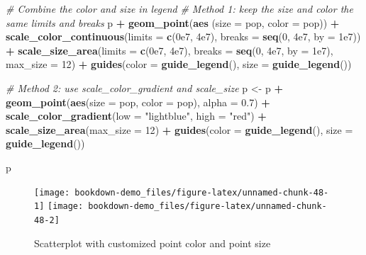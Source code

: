 \documentclass[]{book}
\newenvironment{Shaded}{\begin{snugshade}}{\end{snugshade}}
\newcommand{\KeywordTok}[1]{\textcolor[rgb]{0.13,0.29,0.53}{\textbf{#1}}}
\newcommand{\DataTypeTok}[1]{\textcolor[rgb]{0.13,0.29,0.53}{#1}}
\newcommand{\DecValTok}[1]{\textcolor[rgb]{0.00,0.00,0.81}{#1}}
\newcommand{\FloatTok}[1]{\textcolor[rgb]{0.00,0.00,0.81}{#1}}
\newcommand{\StringTok}[1]{\textcolor[rgb]{0.31,0.60,0.02}{#1}}
\newcommand{\CommentTok}[1]{\textcolor[rgb]{0.56,0.35,0.01}{\textit{#1}}}
\newcommand{\OperatorTok}[1]{\textcolor[rgb]{0.81,0.36,0.00}{\textbf{#1}}}
\newcommand{\NormalTok}[1]{#1}
\begin{document}
\begin{Shaded}
\begin{Highlighting}[]
\CommentTok{# Combine the color and size in legend}
\CommentTok{# Method 1: keep the size and color the same limits and breaks}
\NormalTok{p }\OperatorTok{+}\StringTok{ }\KeywordTok{geom_point}\NormalTok{(}\KeywordTok{aes}\NormalTok{ (}\DataTypeTok{size =}\NormalTok{ pop, }\DataTypeTok{color =}\NormalTok{ pop)) }\OperatorTok{+}
\StringTok{  }\KeywordTok{scale_color_continuous}\NormalTok{(}\DataTypeTok{limits =} \KeywordTok{c}\NormalTok{(}\FloatTok{0e7}\NormalTok{, }\FloatTok{4e7}\NormalTok{), }
                         \DataTypeTok{breaks =} \KeywordTok{seq}\NormalTok{(}\DecValTok{0}\NormalTok{, }\FloatTok{4e7}\NormalTok{, }\DataTypeTok{by =} \FloatTok{1e7}\NormalTok{)) }\OperatorTok{+}
\StringTok{  }\KeywordTok{scale_size_area}\NormalTok{(}\DataTypeTok{limits =} \KeywordTok{c}\NormalTok{(}\FloatTok{0e7}\NormalTok{, }\FloatTok{4e7}\NormalTok{), }
                  \DataTypeTok{breaks =} \KeywordTok{seq}\NormalTok{(}\DecValTok{0}\NormalTok{, }\FloatTok{4e7}\NormalTok{, }\DataTypeTok{by =} \FloatTok{1e7}\NormalTok{), }\DataTypeTok{max_size =} \DecValTok{12}\NormalTok{) }\OperatorTok{+}
\StringTok{  }\KeywordTok{guides}\NormalTok{(}\DataTypeTok{color =} \KeywordTok{guide_legend}\NormalTok{(), }\DataTypeTok{size =} \KeywordTok{guide_legend}\NormalTok{()) }

\CommentTok{# Method 2: use scale_color_gradient and scale_size}
\NormalTok{p <-}\StringTok{ }\NormalTok{p }\OperatorTok{+}\StringTok{ }\KeywordTok{geom_point}\NormalTok{(}\KeywordTok{aes}\NormalTok{(}\DataTypeTok{size =}\NormalTok{ pop, }\DataTypeTok{color =}\NormalTok{ pop), }\DataTypeTok{alpha =} \FloatTok{0.7}\NormalTok{) }\OperatorTok{+}
\StringTok{   }\KeywordTok{scale_color_gradient}\NormalTok{(}\DataTypeTok{low =} \StringTok{"lightblue"}\NormalTok{, }\DataTypeTok{high =} \StringTok{"red"}\NormalTok{) }\OperatorTok{+}
\StringTok{   }\KeywordTok{scale_size_area}\NormalTok{(}\DataTypeTok{max_size =} \DecValTok{12}\NormalTok{) }\OperatorTok{+}
\StringTok{   }\KeywordTok{guides}\NormalTok{(}\DataTypeTok{color =} \KeywordTok{guide_legend}\NormalTok{(), }\DataTypeTok{size =} \KeywordTok{guide_legend}\NormalTok{())}

\NormalTok{p}
\end{Highlighting}
\end{Shaded}

\begin{figure}
\texttt{[image: bookdown-demo\_files/figure-latex/unnamed-chunk-48-1]} \texttt{[image: bookdown-demo\_files/figure-latex/unnamed-chunk-48-2]} \caption{Scatterplot with customized point color and point size}\label{fig:unnamed-chunk-48}
\end{figure}
\end{document}
